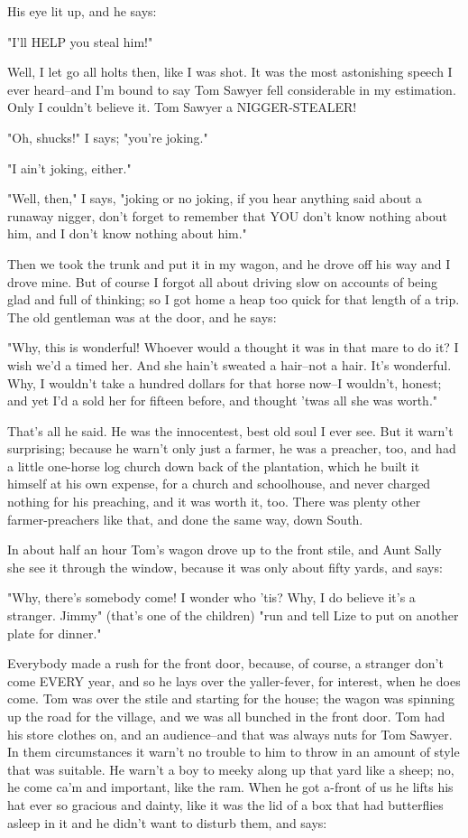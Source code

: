 His eye lit up, and he says:

"I'll HELP you steal him!"

Well, I let go all holts then, like I was shot.  It was the most
astonishing speech I ever heard--and I'm bound to say Tom Sawyer fell
considerable in my estimation.  Only I couldn't believe it.  Tom Sawyer a
NIGGER-STEALER!

"Oh, shucks!"  I says; "you're joking."

"I ain't joking, either."

"Well, then," I says, "joking or no joking, if you hear anything said
about a runaway nigger, don't forget to remember that YOU don't know
nothing about him, and I don't know nothing about him."

Then we took the trunk and put it in my wagon, and he drove off his way
and I drove mine.  But of course I forgot all about driving slow on
accounts of being glad and full of thinking; so I got home a heap too
quick for that length of a trip.  The old gentleman was at the door, and
he says:

"Why, this is wonderful!  Whoever would a thought it was in that mare to
do it?  I wish we'd a timed her.  And she hain't sweated a hair--not a
hair. It's wonderful.  Why, I wouldn't take a hundred dollars for that
horse now--I wouldn't, honest; and yet I'd a sold her for fifteen
before, and thought 'twas all she was worth."

That's all he said.  He was the innocentest, best old soul I ever see.
But it warn't surprising; because he warn't only just a farmer, he was a
preacher, too, and had a little one-horse log church down back of the
plantation, which he built it himself at his own expense, for a church
and schoolhouse, and never charged nothing for his preaching, and it was
worth it, too.  There was plenty other farmer-preachers like that, and
done the same way, down South.

In about half an hour Tom's wagon drove up to the front stile, and Aunt
Sally she see it through the window, because it was only about fifty
yards, and says:

"Why, there's somebody come!  I wonder who 'tis?  Why, I do believe it's
a stranger.  Jimmy" (that's one of the children) "run and tell Lize to
put on another plate for dinner."

Everybody made a rush for the front door, because, of course, a stranger
don't come EVERY year, and so he lays over the yaller-fever, for
interest, when he does come.  Tom was over the stile and starting for the
house; the wagon was spinning up the road for the village, and we was all
bunched in the front door.  Tom had his store clothes on, and an
audience--and that was always nuts for Tom Sawyer.  In them circumstances
it warn't no trouble to him to throw in an amount of style that was
suitable.  He warn't a boy to meeky along up that yard like a sheep; no,
he come ca'm and important, like the ram.  When he got a-front of us he
lifts his hat ever so gracious and dainty, like it was the lid of a box
that had butterflies asleep in it and he didn't want to disturb them, and
says:

